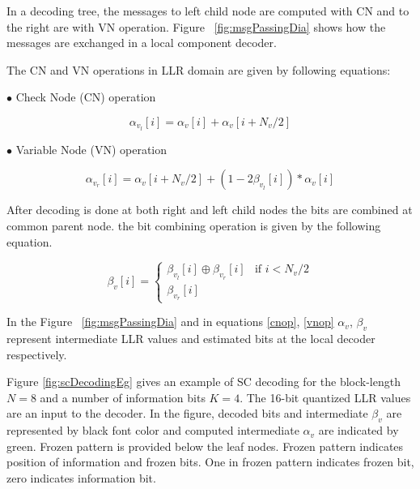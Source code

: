 In a decoding  tree, the messages to left child node are computed with CN and to the right are with VN operation.  Figure ~\ref{fig:msgPassingDia} shows how the messages are exchanged in a local component decoder.

The CN and VN operations in LLR domain are given by following equations:

$\bullet$ Check Node (CN) operation

\begin{equation} \label{cnop}
	\alpha_{v_{l}}[i] = \alpha_{v}[i] + \alpha_{v}[i + N_{v}/2]
\end{equation}

$\bullet$ Variable Node (VN) operation

\begin{equation} \label{vnop}
\alpha_{v_{r}}[i] = \alpha_{v}[i + N_{v}/2] + (1 - 2\beta_{v_{l}}[i]) * \alpha_{v}[i]
\end{equation}

After decoding is done at both right and left child nodes the bits are combined at common parent node. the bit combining operation is given by the following equation.

\begin{equation*} \label{bitCombination}
\beta_{v}[i] = \begin{cases}
				\beta_{v_{l}}[i] \oplus \beta_{v_{r}}[i] & \text{if }i < N_{v}/2 \\
				\beta_{v_{r}}[i]
				\end{cases}
\end{equation*}

In the Figure ~\ref{fig:msgPassingDia} and in equations \eqref{cnop}, \eqref{vnop}  $\alpha_{v}$, $\beta_{v}$ represent intermediate LLR values and estimated bits at the local decoder respectively.

Figure \ref{fig:scDecodingEg} gives an example of SC decoding for the block-length $N=8$ and a number of information bits $K=4$. The 16-bit quantized LLR values are an input to the decoder. In the figure, decoded bits and intermediate $\beta_{v}$ are represented by black font color and computed intermediate $\alpha_{v}$ are indicated by green. Frozen pattern is provided below the leaf nodes. Frozen pattern indicates position of information and frozen bits. One in frozen pattern indicates frozen bit, zero indicates information bit.

